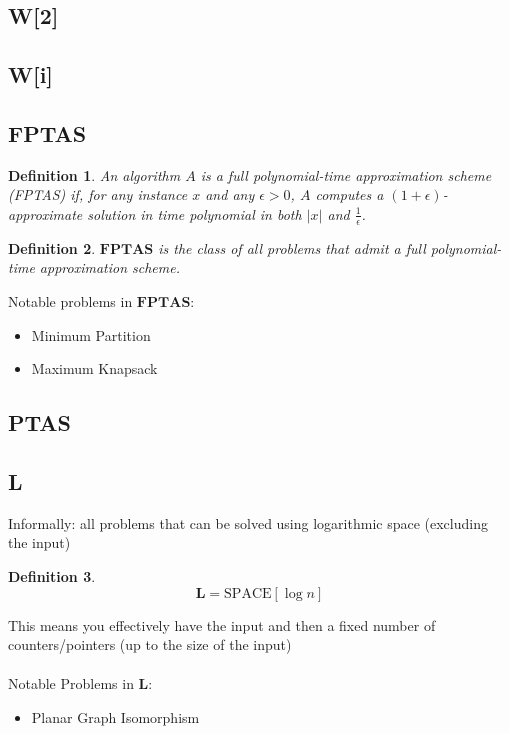 \documentclass[]{article}
\theoremstyle{break}
\theoremstyle{break}
\newtheorem{definition}{Definition}[section]
\begin{document}
\subsection{W[2]}
\subsection{W[i]}
\label{sec:W}
\subsection{FPTAS} \label{sec:FPTAS}

\begin{definition}
	An algorithm $A$ is a full polynomial-time approximation scheme (FPTAS) if, for any instance $x$ and any $\epsilon > 0$, $A$ computes a $(1 + \epsilon)$-approximate solution in time polynomial in both $|x|$ and $\frac{1}{\epsilon}$.
\end{definition}

\begin{definition}
	$\mathbf{FPTAS}$ is the class of all problems that admit a full polynomial-time approximation scheme.
\end{definition}
$ $
\\
Notable problems in $\mathbf{FPTAS}$:
\begin{itemize}
	\item Minimum Partition
	\item Maximum Knapsack
\end{itemize}

\subsection{PTAS}

\subsection{L}
\label{sec:L}
Informally: all problems that can be solved using logarithmic space (excluding the input)
\\
\begin{definition}
	$$\mathbf{L} = \hyperref[sec:SPACE]{\text{SPACE}[\log n]}$$
\end{definition}
$ $
\\
This means you effectively have the input and then a fixed number of counters/pointers (up to the size of the input)
\\
\\
Notable Problems in $\mathbf{L}$:
\begin{itemize}
	\item Planar Graph Isomorphism
\end{itemize}
\end{document}
